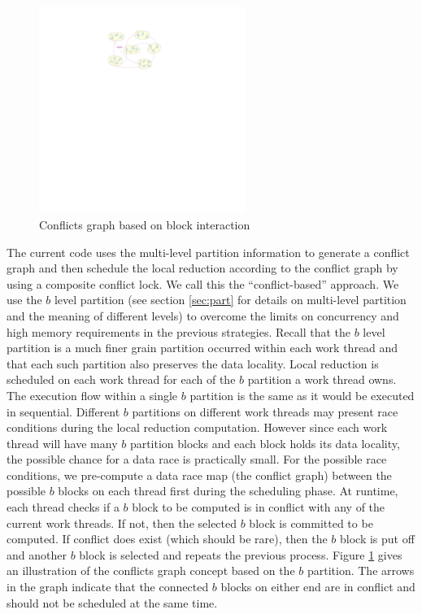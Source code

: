 \documentclass{article}
\begin{document}
\begin{figure}[h]
  \begin{center}
    \includegraphics[width=0.6\textwidth]{block-conflicts}
    \caption{Conflicts graph based on block interaction\label{fig:bc}}
  \end{center}
\end{figure}

The current code uses the multi-level partition information to generate
a conflict graph and then schedule the local reduction according to the
conflict graph by using a composite conflict lock.  We call this the
``conflict-based'' approach.  We use the $b$ level partition (see
section \ref{sec:part} for details on multi-level partition and the
meaning of different levels) to overcome the limits on concurrency and
high memory requirements in the previous strategies.  Recall that the
$b$ level partition is a much finer grain partition occurred within each
work thread and that each such partition also preserves the data
locality.  Local reduction is scheduled on each work thread for each of
the $b$ partition a work thread owns.  The execution flow within a
single $b$ partition is the same as it would be executed in sequential.
Different $b$ partitions on different work threads may present race
conditions during the local reduction computation.  However since each
work thread will have many $b$ partition blocks and each block holds its
data locality, the possible chance for a data race is practically small.
For the possible race conditions, we pre-compute a data race map (the
conflict graph) between the possible $b$ blocks on each thread first
during the scheduling phase.  At runtime, each thread checks if a $b$
block to be computed is in conflict with any of the current work
threads.  If not, then the selected $b$ block is committed to be
computed.  If conflict does exist (which should be rare), then the $b$
block is put off and another $b$ block is selected and repeats the
previous process.  Figure \ref{fig:bc} gives an illustration of the
conflicts graph concept based on the $b$ partition.  The arrows in the
graph indicate that the connected $b$ blocks on either end are in
conflict and should not be scheduled at the same time.
\end{document}
